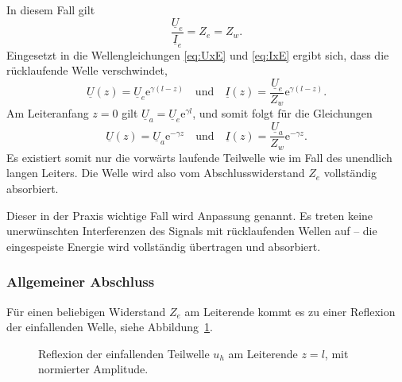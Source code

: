 \documentclass[paper=a4, parskip=half-, ngerman, fontsize=11pt]{scrreprt}
\begin{document}
In diesem Fall gilt
\[ \frac{\underline{U}_{e}}{\underline{I}_{e}} = Z_{e} = Z_{w}. \]
Eingesetzt in die Wellengleichungen \eqref{eq:UxE} und \eqref{eq:IxE} ergibt sich, dass die rücklaufende Welle
verschwindet,
\[ \underline{U}(z) = \underline{U}_{e} \mathrm{e}^{\gamma (l - z)} \quad \text{und} \quad
\underline{I}(z) = \frac{\underline{U}_{e}}{Z_{w}} \mathrm{e}^{\gamma (l - z)}. \]
Am Leiteranfang $z = 0$ gilt $\underline{U}_{a} = \underline{U}_{e} \mathrm{e}^{\gamma l}$, und somit
folgt für die Gleichungen
\[ \underline{U}(z) = \underline{U}_{a} \mathrm{e}^{- \gamma z} \quad \text{und} \quad
\underline{I}(z) = \frac{\underline{U}_{a}}{Z_{w}} \mathrm{e}^{- \gamma z}. \]
Es existiert somit nur die vorwärts laufende Teilwelle wie im Fall des unendlich langen Leiters. Die Welle wird also
vom Abschlusswiderstand $Z_{e}$ vollständig absorbiert.

Dieser in der Praxis wichtige Fall wird Anpassung genannt. Es treten keine unerwünschten Interferenzen des Signals mit
rücklaufenden Wellen auf -- die eingespeiste Energie wird vollständig übertragen und absorbiert.

\subsubsection{Allgemeiner Abschluss}
Für einen beliebigen Widerstand $Z_{e}$ am Leiterende kommt es zu einer Reflexion der einfallenden Welle, siehe
Abbildung~\ref{ReflektierteWelle}.
\begin{figure}[!htb]
    \begin{center}
        
        \caption{Reflexion der einfallenden Teilwelle $u_{h}$ am Leiterende $z=l$, mit normierter Amplitude.}
        \label{ReflektierteWelle}
    \end{center}
\end{figure}
\end{document}
